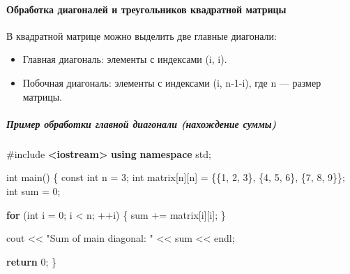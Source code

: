 \documentclass[
]{article}
\newenvironment{Shaded}{}{}
\newcommand{\AttributeTok}[1]{\textcolor[rgb]{0.49,0.56,0.16}{#1}}
\newcommand{\ControlFlowTok}[1]{\textcolor[rgb]{0.00,0.44,0.13}{\textbf{#1}}}
\newcommand{\DataTypeTok}[1]{\textcolor[rgb]{0.56,0.13,0.00}{#1}}
\newcommand{\DecValTok}[1]{\textcolor[rgb]{0.25,0.63,0.44}{#1}}
\newcommand{\ImportTok}[1]{\textcolor[rgb]{0.00,0.50,0.00}{\textbf{#1}}}
\newcommand{\KeywordTok}[1]{\textcolor[rgb]{0.00,0.44,0.13}{\textbf{#1}}}
\newcommand{\NormalTok}[1]{#1}
\newcommand{\OperatorTok}[1]{\textcolor[rgb]{0.40,0.40,0.40}{#1}}
\newcommand{\PreprocessorTok}[1]{\textcolor[rgb]{0.74,0.48,0.00}{#1}}
\newcommand{\StringTok}[1]{\textcolor[rgb]{0.25,0.44,0.63}{#1}}
\providecommand{\tightlist}{%
  \setlength{\itemsep}{0pt}\setlength{\parskip}{0pt}}
\begin{document}
\paragraph{Обработка диагоналей и треугольников квадратной
матрицы}\label{ux43eux431ux440ux430ux431ux43eux442ux43aux430-ux434ux438ux430ux433ux43eux43dux430ux43bux435ux439-ux438-ux442ux440ux435ux443ux433ux43eux43bux44cux43dux438ux43aux43eux432-ux43aux432ux430ux434ux440ux430ux442ux43dux43eux439-ux43cux430ux442ux440ux438ux446ux44b}

В квадратной матрице можно выделить две главные диагонали:

\begin{itemize}
\tightlist
\item
  Главная диагональ: элементы с индексами (i, i).
\item
  Побочная диагональ: элементы с индексами (i, n-1-i), где n --- размер
  матрицы.
\end{itemize}

\subparagraph{Пример обработки главной диагонали (нахождение
суммы)}\label{ux43fux440ux438ux43cux435ux440-ux43eux431ux440ux430ux431ux43eux442ux43aux438-ux433ux43bux430ux432ux43dux43eux439-ux434ux438ux430ux433ux43eux43dux430ux43bux438-ux43dux430ux445ux43eux436ux434ux435ux43dux438ux435-ux441ux443ux43cux43cux44b}

\begin{Shaded}
\begin{Highlighting}[]
\PreprocessorTok{\#include }\ImportTok{\textless{}iostream\textgreater{}}
\KeywordTok{using} \KeywordTok{namespace}\NormalTok{ std}\OperatorTok{;}

\DataTypeTok{int}\NormalTok{ main}\OperatorTok{()} \OperatorTok{\{}
    \AttributeTok{const} \DataTypeTok{int}\NormalTok{ n }\OperatorTok{=} \DecValTok{3}\OperatorTok{;}
    \DataTypeTok{int}\NormalTok{ matrix}\OperatorTok{[}\NormalTok{n}\OperatorTok{][}\NormalTok{n}\OperatorTok{]} \OperatorTok{=} \OperatorTok{\{\{}\DecValTok{1}\OperatorTok{,} \DecValTok{2}\OperatorTok{,} \DecValTok{3}\OperatorTok{\},}
                        \OperatorTok{\{}\DecValTok{4}\OperatorTok{,} \DecValTok{5}\OperatorTok{,} \DecValTok{6}\OperatorTok{\},}
                        \OperatorTok{\{}\DecValTok{7}\OperatorTok{,} \DecValTok{8}\OperatorTok{,} \DecValTok{9}\OperatorTok{\}\};}
    \DataTypeTok{int}\NormalTok{ sum }\OperatorTok{=} \DecValTok{0}\OperatorTok{;}

    \ControlFlowTok{for} \OperatorTok{(}\DataTypeTok{int}\NormalTok{ i }\OperatorTok{=} \DecValTok{0}\OperatorTok{;}\NormalTok{ i }\OperatorTok{\textless{}}\NormalTok{ n}\OperatorTok{;} \OperatorTok{++}\NormalTok{i}\OperatorTok{)} \OperatorTok{\{}
\NormalTok{        sum }\OperatorTok{+=}\NormalTok{ matrix}\OperatorTok{[}\NormalTok{i}\OperatorTok{][}\NormalTok{i}\OperatorTok{];}
    \OperatorTok{\}}

\NormalTok{    cout }\OperatorTok{\textless{}\textless{}} \StringTok{"Sum of main diagonal: "} \OperatorTok{\textless{}\textless{}}\NormalTok{ sum }\OperatorTok{\textless{}\textless{}}\NormalTok{ endl}\OperatorTok{;}

    \ControlFlowTok{return} \DecValTok{0}\OperatorTok{;}
\OperatorTok{\}}
\end{Highlighting}
\end{Shaded}
\end{document}
